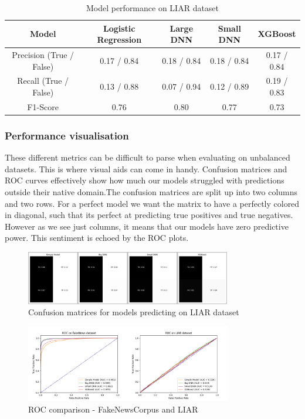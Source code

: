 \begin{table}[htpb]
  \centering
  \caption{Model performance on LIAR dataset}
  \label{tab:liarperformance}
  \begin{tabular}{c|cccc}
    Model & Logistic Regression & Large DNN & Small DNN & XGBoost \\ \hline
    Precision (True / False) & 0.17 / 0.84  & 0.18 / 0.84 & 0.18 / 0.84 & 0.17 / 0.84 \\ \hline
    Recall (True / False) & 0.13 / 0.88 & 0.07 / 0.94 & 0.12 / 0.89 & 0.19 / 0.83 \\ \hline
    F1-Score& 0.76 & 0.80 & 0.77 & 0.73 \\
  \end{tabular}
\end{table}

\subsubsection{Performance visualisation}
These different metrics can be difficult to parse when evaluating on unbalanced datasets. This is where visual aids can
come in handy. Confusion matrices and ROC curves effectively show how much our models struggled with predictions outside
their native domain.The confusion matrices are split up into two columns and two rows. For a perfect model we want the
matrix to have a perfectly colored in diagonal, such that its perfect at predicting true positives and true negatives. However as we see just
columns, it means that our models have zero predictive power. This sentiment is echoed by the ROC plots.

\begin{figure}[htpb]
  \centering
  \includegraphics[width=0.8\textwidth]{figures/matrix_combined}
  \caption{Confusion matrices for  models predicting on LIAR dataset}
  \label{fig:conf_mat}
\end{figure}
\begin{figure}[htpb]
  \centering
  \includegraphics[width=0.8\textwidth]{figures/ROC_combined}
  \caption{ROC comparison - FakeNewsCorpus and LIAR}
  \label{fig:roc}
\end{figure}


